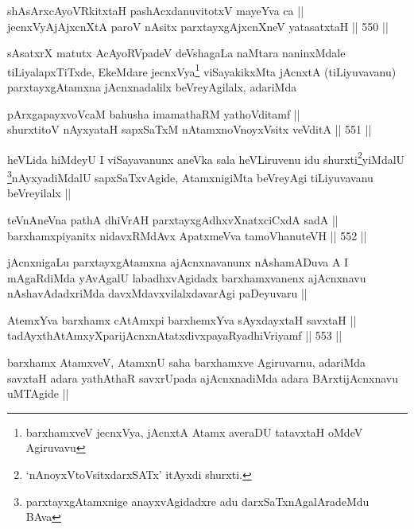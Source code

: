 
\begin{shl}
shAsArxcAyoVRkitxtaH pashAcxdanuvitotxV mayeYva ca || \\
jecnxVyAjAjxcnXtA paroV nAsitx parxtayxgAjxcnXneV yatasatxtaH ||  550 ||  
\end{shl}

\begin{artha}
sAsatxrX matutx AcAyoRVpadeV deVshagaLa naMtara naninxMdale
tiLiyalapxTiTxde, EkeMdare jecnxVya\footnote{barxhamxveV jecnxVya,
  jAcnxtA Atamx averaDU tatavxtaH oMdeV Agiruvavu} viSayakikxMta jAcnxtA
(tiLiyuvavanu) parxtayxgAtamxna jAcnxnadalilx beVreyAgilalx, adariMda 
\end{artha}

\begin{shl}
pArxgapayxvoVcaM bahusha imamathaRM yathoVditamf || \\
shurxtitoV nAyxyataH sapxSaTxM nA\s \s tamxnoV\s noyxV\s sitx veVditA ||  551 ||  
\end{shl}

\begin{artha}
heVLida hiMdeyU I viSayavanunx aneVka sala heVLiruvenu idu
shurxti\footnote{`nAnoyxVtoV\s sitxdarxSATx' itAyxdi
  shurxti.}yiMdalU \footnote{parxtayxgAtamxnige anayxvAgidadxre adu
  darxSaTxnAgalAradeMdu BAva}nAyxyadiMdalU sapxSaTxvAgide,
AtamxnigiMta beVreyAgi tiLiyuvavanu beVreyilalx ||
\end{artha}

\begin{shl}
teVnAneVna pathA dhiVrAH parxtayxgAdhxvXnatxciCxdA sadA || \\
barxhamxpiyanitx nidavxRMdAvx ApatxmeVva tamoVhanuteVH ||  552 ||  
\end{shl}

\begin{artha}
jAcnxnigaLu parxtayxgAtamxna ajAcnxnavanunx nAshamADuva A I mAgaRdiMda
yAvAgalU labadhxvAgidadx barxhamxvanenx ajAcnxnavu nAshavAdadxriMda
davxMdavxvilalxdavarAgi paDeyuvaru ||
\end{artha}

\begin{shl}
AtemxYva barxhamx cA\s \s tAmx\s pi barxhemxYva sAyxdayxtaH savxtaH || \\
tadAyxthAtAmxyXparijAcnxnAtatxdivxpayaRyadhiVriyamf ||  553 ||  
\end{shl}

\begin{artha}
barxhamx AtamxveV, AtamxnU saha barxhamxve Agiruvarnu, adariMda
savxtaH adara yathAthaR savxrUpada ajAcnxnadiMda adara BArxtijAcnxnavu
uMTAgide ||
\end{artha}

